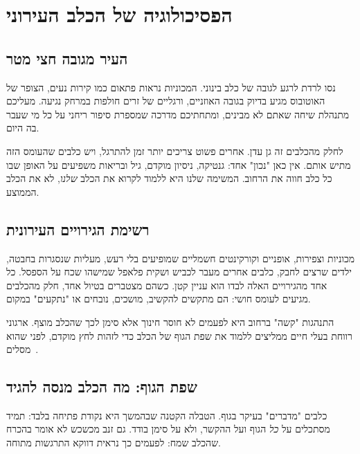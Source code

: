 \chapter{הפסיכולוגיה של הכלב העירוני}

\section{העיר מגובה חצי מטר}
נסו לרדת לרגע לגובה של כלב בינוני. המכוניות נראות פתאום כמו קירות נעים, הצופר של האוטובוס
מגיע בדיוק בגובה האוזניים, ורגליים של זרים חולפות במרחק נגיעה. מעליכם מתנהלת שיחה שאתם לא
מבינים, ומתחתיכם מדרכה שמספרת סיפור ריחני על כל מי שעבר בה היום.

לחלק מהכלבים זה גן עדן. אחרים פשוט צריכים יותר זמן להתרגל, ויש כלבים שהעומס הזה מתיש אותם.
אין כאן "נכון" אחד: גנטיקה, ניסיון מוקדם, גיל ובריאות משפיעים על האופן שבו כל כלב חווה את
הרחוב. המשימה שלנו היא ללמוד לקרוא את הכלב \emph{שלנו}, לא את הכלב הממוצע.

\section{רשימת הגירויים העירונית}
מכוניות וצפירות, אופניים וקורקינטים חשמליים שמופיעים בלי רעש, מעליות שנסגרות בחבטה, ילדים
שרצים לחבק, כלבים אחרים מעבר לכביש ושקית פלאפל שמישהו שכח על הספסל. כל אחד מהגירויים האלה
לבדו הוא עניין קטן. כשהם מצטברים בטיול אחד, חלק מהכלבים מגיעים לעומס חושי: הם מתקשים להקשיב,
מושכים, נובחים או "נתקעים" במקום.

\begin{knowbox}
התנהגות "קשה" ברחוב היא לפעמים לא חוסר חינוך אלא סימן לכך שהכלב מוצף. ארגוני רווחת בעלי חיים
ממליצים ללמוד את שפת הגוף של הכלב כדי לזהות לחץ מוקדם, לפני שהוא מסלים~\cite{rspca-behaviour}.
\end{knowbox}

\section{שפת הגוף: מה הכלב מנסה להגיד}
כלבים "מדברים" בעיקר בגוף. הטבלה הקטנה שבהמשך היא נקודת פתיחה בלבד: תמיד מסתכלים על \emph{כל}
הגוף ועל ההקשר, ולא על סימן בודד. גם זנב מכשכש לא אומר בהכרח שהכלב שמח: לפעמים כך נראית
דווקא התרגשות מתוחה.

